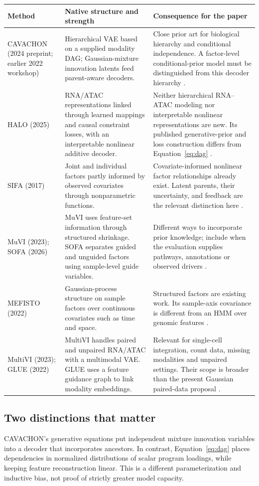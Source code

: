 \documentclass[11pt,a4paper]{article}
\numberwithin{equation}{section}
\begin{document}
\begingroup\small
\renewcommand{\arraystretch}{1.12}
\begin{tabular}{@{}P{.19\textwidth}P{.37\textwidth}P{.38\textwidth}@{}}
\toprule
Method & Native structure and strength & Consequence for the paper\\
\midrule
CAVACHON (2024 preprint; earlier 2022 workshop)
&
Hierarchical VAE based on a supplied modality DAG; Gaussian-mixture
innovation latents feed parent-aware decoders.
&
Close prior art for biological hierarchy and conditional independence.
A factor-level conditional-prior model must be distinguished from this
decoder hierarchy \cite{cavachon}.\\[5pt]
HALO (2025)
&
RNA/ATAC representations linked through learned mappings and causal
constraint losses, with an interpretable nonlinear additive decoder.
&
Neither hierarchical RNA--ATAC modeling nor interpretable nonlinear
representations are new. Its published generative-prior and loss
construction differs from Equation~\eqref{eq:dag} \cite{halo}.\\[5pt]
SIFA (2017)
&
Joint and individual factors partly informed by observed covariates
through nonparametric functions.
&
Covariate-informed nonlinear factor relationships already exist.
Latent parents, their uncertainty, and feedback are the relevant
distinction here \cite{sifa}.\\[5pt]
MuVI (2023); SOFA (2026)
&
MuVI uses feature-set information through structured shrinkage.
SOFA separates guided and unguided factors using sample-level
guide variables.
&
Different ways to incorporate prior knowledge; include when the
evaluation supplies pathways, annotations or observed drivers
\cite{muvi,sofa}.\\[5pt]
MEFISTO (2022)
&
Gaussian-process structure on sample factors over continuous
covariates such as time and space.
&
Structured factors are existing work. Its sample-axis covariance is
different from an HMM over genomic features \cite{mefisto}.\\[5pt]
MultiVI (2023); GLUE (2022)
&
MultiVI handles paired and unpaired RNA/ATAC with a multimodal VAE.
GLUE uses a feature guidance graph to link modality embeddings.
&
Relevant for single-cell integration, count data, missing modalities
and unpaired settings. Their scope is broader than the present
Gaussian paired-data proposal \cite{multivi,glue}.\\
\bottomrule
\end{tabular}
\endgroup

\subsection*{Two distinctions that matter}
CAVACHON's generative equations put independent mixture innovation
variables into a decoder that incorporates ancestors. In contrast,
Equation~\eqref{eq:dag} places dependencies in normalized distributions
of scalar program loadings, while keeping feature reconstruction linear.
This is a different parameterization and inductive bias, not proof of
strictly greater model capacity.
\end{document}
